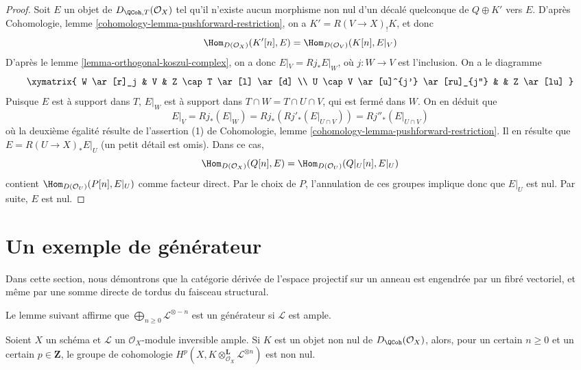 \begin{proof}
\medskip\noindent
Soit $E$ un objet de $D_{\QCoh, T}(\mathcal{O}_X)$ tel qu'il
n'existe aucun morphisme non nul d'un décalé quelconque de $Q \oplus K'$ vers $E$.
D'après Cohomologie, lemme \ref{cohomology-lemma-pushforward-restriction},
on a $K' =  R(V \to X)_! K$, et donc
$$
\Hom_{D(\mathcal{O}_X)}(K'[n], E) = \Hom_{D(\mathcal{O}_V)}(K[n], E|_V)
$$
D'après le lemme \ref{lemma-orthogonal-koszul-complex}, on a donc
$E|_V = Rj_*E|_W$, où $j : W \to V$ est l'inclusion. On a le diagramme
$$
\xymatrix{
W \ar[r]_j & V & Z \cap T \ar[l] \ar[d] \\
U \cap V \ar[u]^{j'} \ar[ru]_{j''} & & Z \ar[lu]
}
$$
Puisque $E$ est à support dans $T$, $E|_W$ est à support dans
$T \cap W = T \cap U \cap V$, qui est fermé dans $W$.
On en déduit que
$$
E|_V = Rj_*(E|_W) = Rj_*(Rj'_*(E|_{U \cap V})) = Rj''_*(E|_{U \cap V})
$$
où la deuxième égalité résulte de l'assertion (1) de
Cohomologie, lemme \ref{cohomology-lemma-pushforward-restriction}.
Il en résulte que $E = R(U \to X)_*E|_U$ (un petit détail est omis).
Dans ce cas,
$$
\Hom_{D(\mathcal{O}_X)}(Q[n], E) = \Hom_{D(\mathcal{O}_U)}(Q|_U[n], E|_U)
$$
contient $\Hom_{D(\mathcal{O}_U)}(P[n], E|_U)$ comme facteur direct.
Par le choix de $P$, l'annulation de ces groupes implique donc que $E|_U$
est nul. Par suite, $E$ est nul.
\end{proof}

\section{Un exemple de générateur}
\label{section-example-generator}

\noindent
Dans cette section, nous démontrons que la catégorie dérivée de l'espace projectif
sur un anneau est engendrée par un fibré vectoriel, et même par une somme
directe de tordus du faisceau structural.

\medskip\noindent
Le lemme suivant affirme que $\bigoplus_{n \geq 0} \mathcal{L}^{\otimes -n}$
est un générateur si $\mathcal{L}$ est ample.

\begin{lemma}
\label{lemma-nonzero-some-cohomology}
Soient $X$ un schéma et $\mathcal{L}$ un
$\mathcal{O}_X$-module inversible ample. Si $K$ est un objet non nul de
$D_\QCoh(\mathcal{O}_X)$, alors, pour un certain $n \geq 0$ et un certain $p \in \mathbf{Z}$,
le groupe de cohomologie
$H^p(X, K \otimes_{\mathcal{O}_X}^\mathbf{L} \mathcal{L}^{\otimes n})$
est non nul.
\end{lemma}

